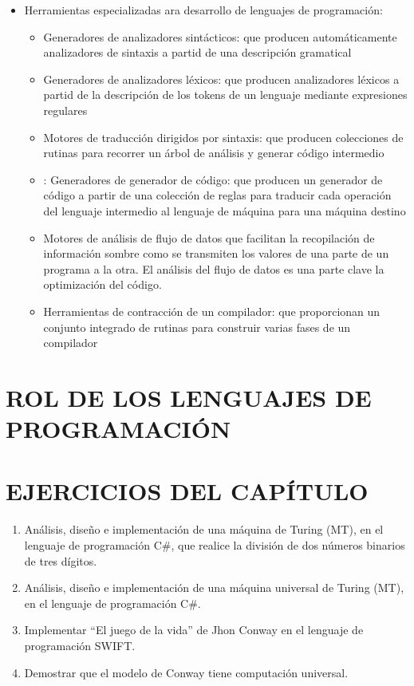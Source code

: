 \begin{itemize}
    \item Herramientas especializadas ara desarrollo de lenguajes de programación:
    \begin{itemize}
        \item Generadores de analizadores sintácticos: que producen automáticamente analizadores de sintaxis a partid de una descripción gramatical
        \item Generadores de analizadores léxicos: que producen analizadores léxicos a partid de la descripción de los tokens de un lenguaje mediante expresiones regulares
        \item Motores de traducción dirigidos por sintaxis: que producen colecciones de rutinas para recorrer un árbol de análisis y generar código intermedio
        \item: Generadores de generador de código: que producen un generador de código a partir de una colección de reglas para traducir cada operación del lenguaje intermedio al lenguaje de máquina para una máquina destino
        \item Motores de análisis de flujo de datos que facilitan la recopilación de información sombre como se transmiten los valores de una parte de un programa a la otra. El análisis del flujo de datos es una parte clave la optimización del código.
        \item Herramientas de contracción de un compilador: que proporcionan un conjunto integrado de rutinas para construir varias fases de un compilador
    \end{itemize}
    
\end{itemize}

\section{ROL DE LOS LENGUAJES DE PROGRAMACIÓN}
\section{EJERCICIOS DEL CAPÍTULO}
\begin{enumerate}
    \item Análisis, diseño e implementación de una máquina de Turing (MT), en el lenguaje de programación C#, que realice la división de dos números binarios de tres dígitos.
    
    \item Análisis, diseño e implementación de una máquina universal de Turing (MT), en el lenguaje de programación C#.
    
    \item Implementar ``El juego de la vida'' de Jhon Conway en el lenguaje de programación SWIFT.
    
    \item Demostrar que el modelo de Conway tiene computación universal.
\end{enumerate}